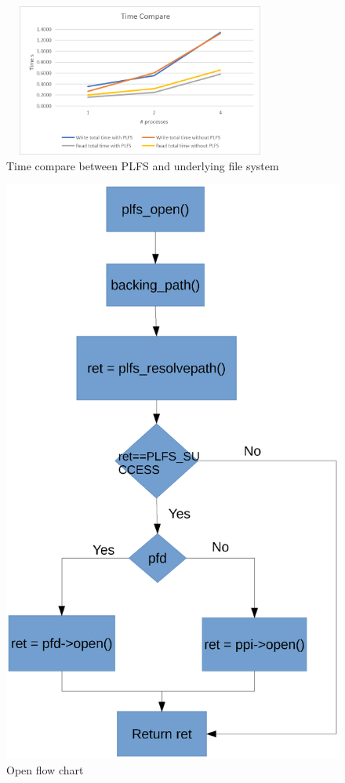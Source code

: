 \documentclass[conference]{IEEEtran}
\begin{document}
\begin{figure}
	\centerline{
	\includegraphics[width=9cm,height=5cm]{Time_Compare.png}}
	\caption{Time compare between PLFS and underlying file system}
\end{figure}

\begin{figure}
	\centerline{
		\includegraphics[scale=0.8]{open.eps}}
	\caption{Open flow chart}
\end{figure}
\end{document}
